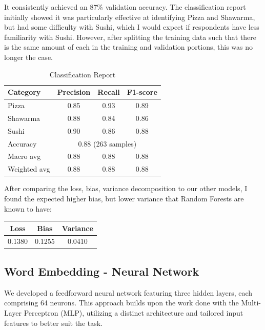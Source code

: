 It consistently achieved an 87\% validation accuracy. The classification report initially showed it was particularly effective at identifying Pizza and Shawarma, but had some difficulty with Sushi, which I would expect if respondents have less familiarity with Sushi. However, after splitting the training data such that there is the same amount of each in the training and validation portions, this was no longer the case.
\begin{table}[ht]
    \centering
    \begin{tabular}{lccc}
        \hline
        Category     & Precision                              & Recall & F1-score \\
        \hline
        Pizza        & 0.85                                   & 0.93   & 0.89     \\
        Shawarma     & 0.88                                   & 0.84   & 0.86     \\
        Sushi        & 0.90                                   & 0.86   & 0.88     \\
        \hline
        Accuracy     & \multicolumn{3}{c}{0.88 (263 samples)}                     \\
        Macro avg    & 0.88                                   & 0.88   & 0.88     \\
        Weighted avg & 0.88                                   & 0.88   & 0.88     \\
        \hline
    \end{tabular}
    \caption{Classification Report}
    \label{tab:classification_report}
\end{table}

After comparing the loss, bias, variance decomposition to our other models, I found the expected higher bias, but lower variance that Random Forests are known to have:
\begin{table}[ht]
    \centering
    \begin{tabular}{ccc}
        \hline
        Loss   & Bias   & Variance \\
        \hline
        0.1380 & 0.1255 & 0.0410   \\
        \hline
    \end{tabular}
    \label{tab:loss_report}
\end{table}

\subsection{Word Embedding - Neural Network}
We developed a feedforward neural network featuring three hidden layers, each comprising 64 neurons. This approach builds upon the work done with the Multi-Layer Perceptron (MLP), utilizing a distinct architecture and tailored input features to better suit the task.

